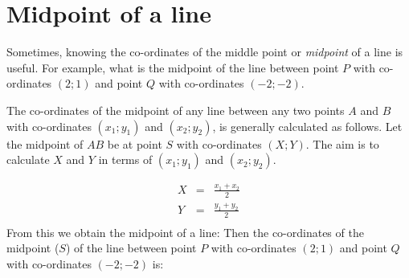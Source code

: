             \section{ Midpoint of a line}
            \nopagebreak
\label{m39119*id68364}Sometimes, knowing the co-ordinates of the middle point or \textsl{midpoint} of a line is useful. For example, what is the midpoint of the line between point $P$ with co-ordinates $(2;1)$ and point $Q$ with co-ordinates $(-2;-2)$.\par 
        \label{m39119*id68433}The co-ordinates of the midpoint of any line between any two points $A$ and $B$ with co-ordinates $({x}_{1};{y}_{1})$ and $({x}_{2};{y}_{2})$, is generally calculated as follows. Let the midpoint of $AB$ be at point $S$ with co-ordinates $(X;Y)$. The aim is to calculate $X$ and $Y$ in terms of $({x}_{1};{y}_{1})$ and $({x}_{2};{y}_{2})$.\par 
    \setcounter{subfigure}{0}
 	\begin{figure}[H] %
    \begin{center}
    \end{center}
 \end{figure}      
        \label{m39119*id68637}\nopagebreak\noindent{}
          
    \begin{eqnarray*}
 X & = & \frac{{x}_{1} + {x}_{2}}{2} \\ 
Y & = & \frac{{y}_{1} + {y}_{2}}{2} \\  
      \end{eqnarray*}
From this we obtain the midpoint of a line:
        \label{m39119*id68788}Then the co-ordinates of the midpoint ($S$) of the line between point $P$ with co-ordinates $(2;1)$ and point $Q$ with co-ordinates $(-2;-2)$ is:\par 
        \label{m39119*id68860}\nopagebreak\noindent{}
          
